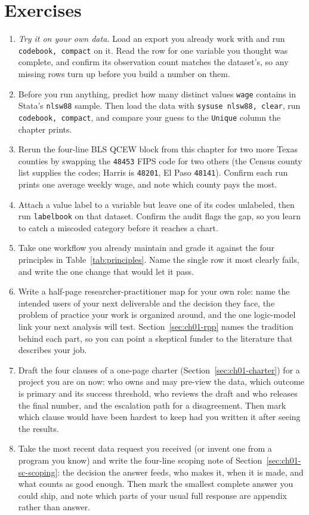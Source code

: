 \documentclass[
    a4paper,
    fontsize=10pt,
    twoside=true,
    numbers=noenddot,
]{kaobook}
\begin{document}
\section*{Exercises}
\begin{enumerate}
\item \emph{Try it on your own data.} Load an export you already work with and run \texttt{codebook, compact} on it. Read the row for one variable you thought was complete, and confirm its observation count matches the dataset's, so any missing rows turn up before you build a number on them.
\item Before you run anything, predict how many distinct values \texttt{wage} contains in Stata's \texttt{nlsw88} sample. Then load the data with \texttt{sysuse nlsw88, clear}, run \texttt{codebook, compact}, and compare your guess to the \texttt{Unique} column the chapter prints.
\item Rerun the four-line BLS QCEW block from this chapter for two more Texas counties by swapping the \texttt{48453} FIPS code for two others (the Census county list supplies the codes; Harris is \texttt{48201}, El Paso \texttt{48141}). Confirm each run prints one average weekly wage, and note which county pays the most.
\item Attach a value label to a variable but leave one of its codes unlabeled, then run \texttt{labelbook} on that dataset. Confirm the audit flags the gap, so you learn to catch a miscoded category before it reaches a chart.
\item Take one workflow you already maintain and grade it against the four principles in Table~\ref{tab:principles}. Name the single row it most clearly fails, and write the one change that would let it pass.
\item Write a half-page researcher-practitioner map for your own role: name the intended users of your next deliverable and the decision they face, the problem of practice your work is organized around, and the one logic-model link your next analysis will test. Section~\ref{sec:ch01-rpp} names the tradition behind each part, so you can point a skeptical funder to the literature that describes your job.
\item Draft the four clauses of a one-page charter (Section~\ref{sec:ch01-charter}) for a project you are on now: who owns and may pre-view the data, which outcome is primary and its success threshold, who reviews the draft and who releases the final number, and the escalation path for a disagreement. Then mark which clause would have been hardest to keep had you written it after seeing the results.
\item Take the most recent data request you received (or invent one from a program you know) and write the four-line scoping note of Section~\ref{sec:ch01-sc-scoping}: the decision the answer feeds, who makes it, when it is made, and what counts as good enough. Then mark the smallest complete answer you could ship, and note which parts of your usual full response are appendix rather than answer.
\end{enumerate}
\end{document}
